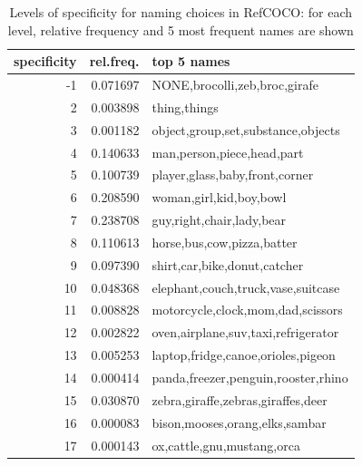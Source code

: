 \documentclass[runningheads]{llncs}
\begin{document}
\begin{table}
\centering
\setlength{\tabcolsep}{4pt}
\begin{tabular}{rrl}
\toprule
 specificity &  rel.freq. &                          top 5 names \\
\midrule
          -1 &   0.071697 &      NONE,brocolli,zeb,broc,girafe \\
           2 &   0.003898 &                         thing,things \\
           3 &   0.001182 &   object,group,set,substance,objects \\
           4 &   0.140633 &           man,person,piece,head,part \\
           5 &   0.100739 &       player,glass,baby,front,corner \\
           6 &   0.208590 &              woman,girl,kid,boy,bowl \\
           7 &   0.238708 &            guy,right,chair,lady,bear \\
           8 &   0.110613 &           horse,bus,cow,pizza,batter \\
           9 &   0.097390 &         shirt,car,bike,donut,catcher \\
          10 &   0.048368 &   elephant,couch,truck,vase,suitcase \\
          11 &   0.008828 &    motorcycle,clock,mom,dad,scissors \\
          12 &   0.002822 &  oven,airplane,suv,taxi,refrigerator \\
          13 &   0.005253 &   laptop,fridge,canoe,orioles,pigeon \\
          14 &   0.000414 &  panda,freezer,penguin,rooster,rhino \\
          15 &   0.030870 &   zebra,giraffe,zebras,giraffes,deer \\
          16 &   0.000083 &       bison,mooses,orang,elks,sambar \\
          17 &   0.000143 &           ox,cattle,gnu,mustang,orca \\
\bottomrule
\end{tabular}\caption{Levels of specificity for naming choices in RefCOCO: for each level, relative frequency and 5 most frequent names are shown}
\label{tab:specnames}
\end{table}


\clearpage



\end{document}
